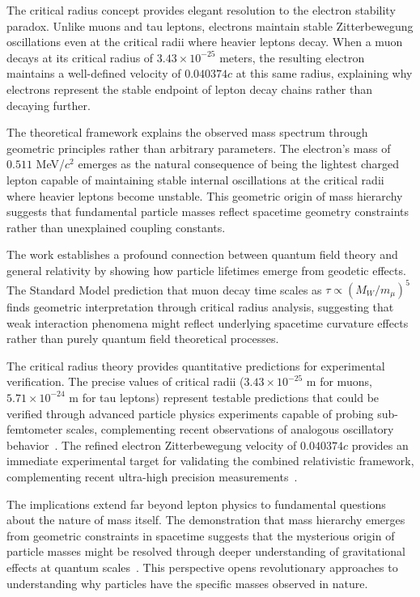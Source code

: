 \documentclass[%
 reprint,
 amsmath,amssymb,
 aps,
]{revtex4-1}
\numberwithin{equation}{section}%
\begin{document}
The critical radius concept provides elegant resolution to the electron stability paradox. Unlike muons and tau leptons, electrons maintain stable Zitterbewegung oscillations even at the critical radii where heavier leptons decay. When a muon decays at its critical radius of $3.43 \times 10^{-25}$ meters, the resulting electron maintains a well-defined velocity of $0.040374c$ at this same radius, explaining why electrons represent the stable endpoint of lepton decay chains rather than decaying further.

The theoretical framework  explains the observed mass spectrum through geometric principles rather than arbitrary parameters. The electron's mass of $0.511$ MeV/$c^{2}$ emerges as the natural consequence of being the lightest charged lepton capable of maintaining stable internal oscillations at the critical radii where heavier leptons become unstable. This geometric origin of mass hierarchy suggests that fundamental particle masses reflect spacetime geometry constraints rather than unexplained coupling constants.

The work establishes a profound connection between quantum field theory and general relativity by showing how particle lifetimes emerge from geodetic effects. The Standard Model prediction that muon decay time scales as $\tau \propto (M_W/m_{\mu})^5$ finds geometric interpretation through critical radius analysis, suggesting that weak interaction phenomena might reflect underlying spacetime curvature effects rather than purely quantum field theoretical processes.

The critical radius theory provides quantitative predictions for experimental verification. The precise values of critical radii ($3.43 \times 10^{-25}$ m for muons, $5.71 \times 10^{-24}$ m for tau leptons) represent testable predictions that could be verified through advanced particle physics experiments capable of probing sub-femtometer scales, complementing recent observations of analogous oscillatory behavior~\cite{walker2013}. The refined electron Zitterbewegung velocity of $0.040374c$ provides an immediate experimental target for validating the combined relativistic framework, complementing recent ultra-high precision measurements~\cite{fan2023}.

The implications extend far beyond lepton physics to fundamental questions about the nature of mass itself. The demonstration that mass hierarchy emerges from geometric constraints in spacetime suggests that the mysterious origin of particle masses might be resolved through deeper understanding of gravitational effects at quantum scales~\cite{nash1983}. This perspective opens revolutionary approaches to understanding why particles have the specific masses observed in nature.
\end{document}
